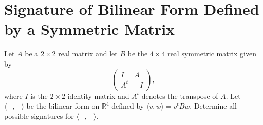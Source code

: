 \documentclass[lang=cn,11pt]{template}
\begin{document}
\section{Signature of Bilinear Form Defined by a Symmetric Matrix}
Let \( A \) be a \( 2 \times 2 \) real matrix and let \( B \) be the \( 4 \times 4 \) real symmetric matrix given by
\[
\begin{pmatrix} I & A \\ A^t & -I \end{pmatrix},
\]
where \( I \) is the \( 2 \times 2 \) identity matrix and \( A^t \) denotes the transpose of \( A \). Let \( \langle -, - \rangle \) be the bilinear form on \( \mathbb{R}^4 \) defined by \( \langle v, w \rangle = v^t B w \). Determine all possible signatures for \( \langle -, - \rangle \).
\end{document}
